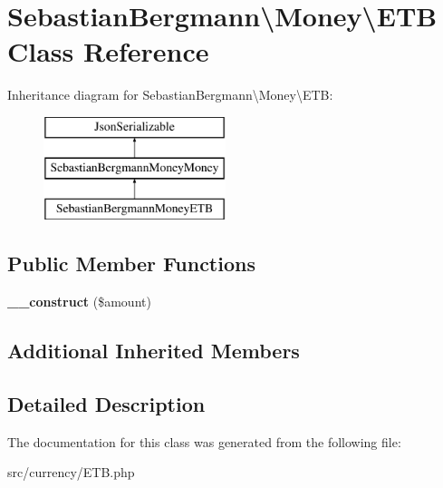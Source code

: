 \hypertarget{classSebastianBergmann_1_1Money_1_1ETB}{}\section{Sebastian\+Bergmann\textbackslash{}Money\textbackslash{}E\+T\+B Class Reference}
\label{classSebastianBergmann_1_1Money_1_1ETB}
Inheritance diagram for Sebastian\+Bergmann\textbackslash{}Money\textbackslash{}E\+T\+B\+:\begin{figure}[H]
\begin{center}
\leavevmode
\includegraphics[height=3.000000cm]{classSebastianBergmann_1_1Money_1_1ETB}
\end{center}
\end{figure}
\subsection*{Public Member Functions}
\begin{DoxyCompactItemize}
\item 
\hypertarget{classSebastianBergmann_1_1Money_1_1ETB_ad51d16c5c3071531d493f2c4c0eb56c7}{}{\bfseries \+\_\+\+\_\+construct} (\$amount)\label{classSebastianBergmann_1_1Money_1_1ETB_ad51d16c5c3071531d493f2c4c0eb56c7}

\end{DoxyCompactItemize}
\subsection*{Additional Inherited Members}


\subsection{Detailed Description}


The documentation for this class was generated from the following file\+:\begin{DoxyCompactItemize}
\item 
src/currency/E\+T\+B.\+php\end{DoxyCompactItemize}
